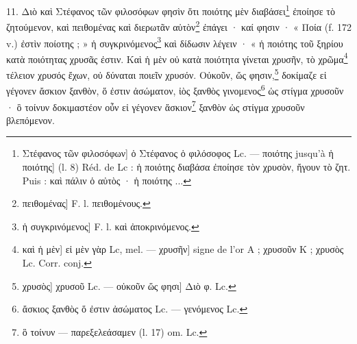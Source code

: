 \documentclass[landscape, a4paper, 11pt, oneside, polutonikogreek, french]{article}
\begin{document}
11. Διὸ καὶ Στέφανος τῶν φιλοσόφων φησὶν ὅτι ποιότης μὲν διαβάσει\footnote{Στέφανος τῶν φιλοσόφων] ὁ Στέφανος ὁ φιλόσοφος Lc. --- ποιότης jusqu'à ἡ ποιότης] (l. 8) Réd. de Lc : ἡ ποιότης διαβάσα ἐποίησε τὸν χρυσὸν, ἤγουν τὸ ζητ. Puis : καὶ πάλιν ὁ αὐτὸς · ἡ ποιότης ...} ἐποίησε τὸ ζητούμενον, καὶ πειθομένας καὶ διερωτᾶν αὐτὸν\footnote{πειθομένας] F. l. πειθομένους.} ἐπάγει · καί φησιν · « Ποία (f. 172 v.) ἐστὶν ποίοτης ; » ἡ συγκρινόμενος\footnote{ἡ συγκρινόμενος] F. l. καὶ ἀποκρινόμενος.} καὶ δίδωσιν λέγειν · « ἡ ποιότης τοῦ ξηρίου κατὰ ποιότητας χρυσᾶς ἐστιν. Καὶ ἡ μὲν οὐ κατὰ ποιότητα γίνεται χρυσῆν, τὸ χρῶμα\footnote{καὶ ἡ μὲν] εἰ μὲν γὰρ Lc, mel. --- χρυσῆν] signe de l'or A ; χρυσοῦν K ; χρυσὸς Lc. Corr. conj.} τέλειον χρυσός ἔχων, οὐ δύναται ποιεῖν χρυσόν. Οὐκοῦν, ὥς φησιν,\footnote{χρυσὸς] χρυσοῦ Lc. --- οὐκοῦν ὥς φησι] Διὸ φ. Lc.} δοκίμαζε εἰ γέγονεν ἄσκιον ξανθὸν, ὅ ἐστιν ἀσώματον, ἰὸς ξανθὸς γινομενος\footnote{ἄσκιος ξανθὸς ὅ ἐστιν ἀσώματος Lc. --- γενόμενος Lc.} ὡς στίγμα χρυσοῦν · ὃ τοίνυν δοκιμαστέον οὖν εἰ γέγονεν ἄσκιον\footnote{ὃ τοίνυν --- παρεξελεάσαμεν (l. 17) om. Lc.} ξανθὸν ὡς στίγμα χρυσοῦν βλεπόμενον.
\end{document}
